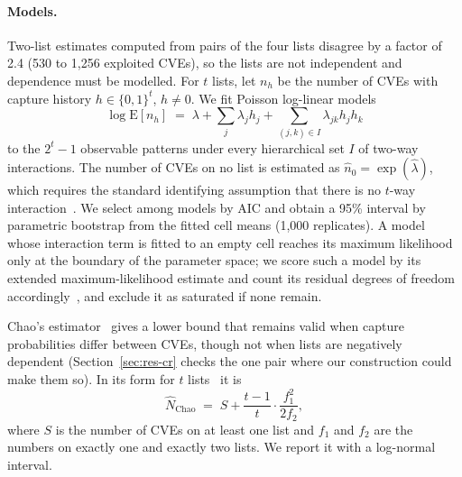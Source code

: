 \paragraph{Models.} Two-list estimates computed from pairs of the four lists
disagree by a factor of 2.4 (530 to 1,256 exploited CVEs), so the lists are not
independent and dependence must be modelled. For $t$ lists, let $n_h$ be the
number of CVEs with capture history $h \in \{0,1\}^t$, $h \neq 0$. We fit
Poisson log-linear models~\cite{bishop1975,iwgdmf1995}
\begin{equation}\label{eq:loglin}
\log \mathrm{E}[n_h] \;=\; \lambda + \sum_{j} \lambda_j h_j
+ \sum_{(j,k) \in I} \lambda_{jk} h_j h_k
\end{equation}
to the $2^t - 1$ observable patterns under every hierarchical set
$I$ of two-way interactions. The number of CVEs on no list is
estimated as $\hat{n}_0 = \exp(\hat\lambda)$, which requires the standard
identifying assumption that there is no $t$-way
interaction~\cite{iwgdmf1995,bishop1975}. We select among models by AIC and
obtain a 95\% interval by parametric bootstrap from the fitted cell means
(1,000 replicates). A model whose interaction term is fitted to an empty cell
reaches its maximum likelihood only at the boundary of the parameter space; we
score such a model by its extended maximum-likelihood estimate and count its
residual degrees of freedom accordingly~\cite{fienberg2012mle}, and exclude it
as saturated if none remain.

Chao's estimator~\cite{chao1987} gives a lower bound that remains valid when
capture probabilities differ between CVEs, though not when lists are negatively
dependent (Section~\ref{sec:res-cr} checks the one pair where our construction
could make them so). In its form for $t$ lists~\cite{chao1989sparse} it is
\begin{equation}\label{eq:chao}
\hat{N}_{\mathrm{Chao}} \;=\; S + \frac{t-1}{t}\cdot\frac{f_1^2}{2 f_2},
\end{equation}
where $S$ is the number of CVEs on at least one list and $f_1$ and $f_2$ are the
numbers on exactly one and exactly two lists. We report it with a log-normal
interval.

